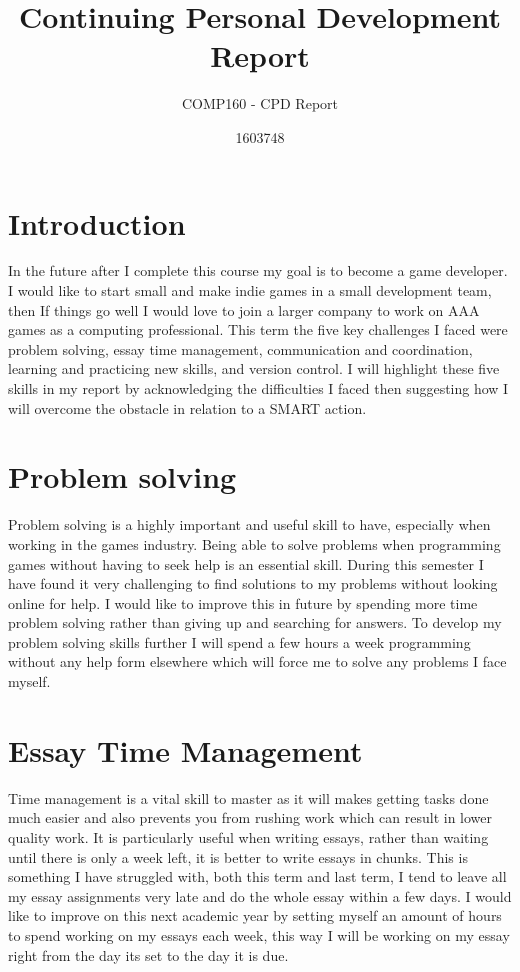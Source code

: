 \documentclass{scrartcl}
\title{Continuing Personal Development Report}
\subtitle{COMP160 - CPD Report}
\author{1603748}
\begin{document}
\maketitle

\section*{Introduction}
In the future after I complete this course my goal is to become a game developer. I would like to start small and make indie games in a small development team, then If things go well I would love to join a larger company to work on AAA games as a computing professional. This term the five key challenges I faced were problem solving, essay time management, communication and coordination, learning and practicing new skills, and version control. I will highlight these five skills in my report by acknowledging the difficulties I faced then suggesting how I will overcome the obstacle in relation to a SMART action. 

\section{Problem solving}
Problem solving is a highly important and useful skill to have, especially when working in the games industry. Being able to solve problems when programming games without having to seek help is an essential skill. During this semester I have found it very challenging to find solutions to my problems without looking online for help. I would like to improve this in future by spending more time problem solving rather than giving up and searching for answers. To develop my problem solving skills further I will spend a few hours a week programming without any help form elsewhere which will force me to solve any problems I face myself. 

\section{Essay Time Management}
Time management is a vital skill to master as it will makes getting tasks done much easier and also prevents you from rushing work which can result in lower quality work. It is particularly useful when writing essays, rather than waiting until there is only a week left, it is better to write essays in chunks. This is something I have struggled with, both this term and last term, I tend to leave all my essay assignments very late and do the whole essay within a few days. I would like to improve on this next academic year by setting myself an amount of hours to spend working on my essays each week, this way I will be working on my essay right from the day its set to the day it is due. 
\end{document}

